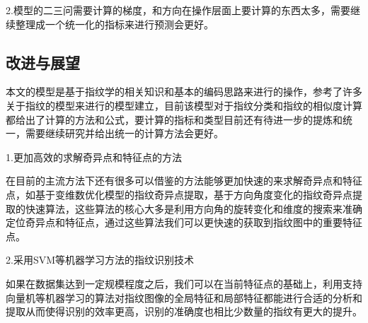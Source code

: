 \documentclass[withoutpreface,bwprint]{cumcmthesis} %
\begin{document}
2.模型的二三问需要计算的梯度，和方向在操作层面上要计算的东西太多，需要继续整理成一个统一化的指标来进行预测会更好。

\subsection{改进与展望}
本文的模型是基于指纹学的相关知识和基本的编码思路来进行的操作，参考了许多关于指纹的模型来进行的模型建立，目前该模型对于指纹分类和指纹的相似度计算都给出了计算的方法和公式，要计算的指标和类型目前还有待进一步的提炼和统一，需要继续研究并给出统一的计算方法会更好。

1.更加高效的求解奇异点和特征点的方法

在目前的主流方法下还有很多可以借鉴的方法能够更加快速的来求解奇异点和特征点，如基于变维数优化模型的指纹奇异点提取，基于方向角度变化的指纹奇异点提取的快速算法，这些算法的核心大多是利用方向角的旋转变化和维度的搜索来准确定位奇异点和特征点，通过这些算法我们可以更快速的获取到指纹图中的重要特征点。

2.采用SVM等机器学习方法的指纹识别技术

如果在数据集达到一定规模程度之后，我们可以在当前特征点的基础上，利用支持向量机等机器学习的算法对指纹图像的全局特征和局部特征都能进行合适的分析和提取从而使得识别的效率更高，识别的准确度也相比少数量的指纹有更大的提升。



\nocite{*}

	
\end{document}
